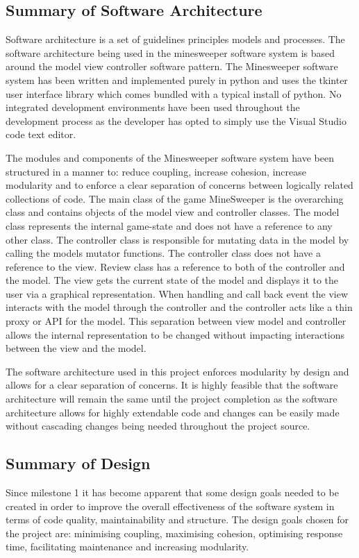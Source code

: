 \documentclass[12pt, a4]{report}
\begin{document}
\subsection{Summary of Software Architecture}
\par Software architecture is a set of guidelines principles models and processes. The software architecture being used in the minesweeper software system is based around the model view controller software pattern. The Minesweeper software system has been written and implemented purely in python and uses the tkinter user interface library which comes bundled with a typical install of python. No integrated development environments have been used throughout the development process as the developer has opted to simply use the Visual Studio code text editor. 
\newline
\par The modules and components of the Minesweeper software system have been structured in a manner to: reduce coupling, increase cohesion, increase modularity and to enforce a clear separation of concerns between logically related collections of code. The main class of the game MineSweeper is the overarching class and contains objects of the model view and controller classes. The model class represents the internal game-state and does not have a reference to any other class. The controller class is responsible for mutating data in the model by calling the models mutator functions. The controller class does not have a reference to the view. Review class has a reference to both of the controller and the model. The view gets the current state of the model and displays it to the user via a graphical representation. When handling and call back event the view interacts with the model through the controller and the controller acts like a thin proxy or API for the model. This separation between view model and controller allows the internal representation to be changed without impacting interactions between the view and the model. 
\newline
\par The software architecture used in this project enforces modularity by design and allows for a clear separation of concerns. It is highly feasible that the software architecture will remain the same until the project completion as the software architecture allows for highly extendable code and changes can be easily made without cascading changes being needed throughout the project source.

\subsection{Summary of Design}
\par Since milestone 1 it has become apparent that some design goals needed to be created in order to improve the overall effectiveness of the software system in terms of code quality, maintainability and structure. The design goals chosen for the project are: minimising coupling, maximising cohesion, optimising response time, facilitating maintenance and increasing modularity.
\end{document}
